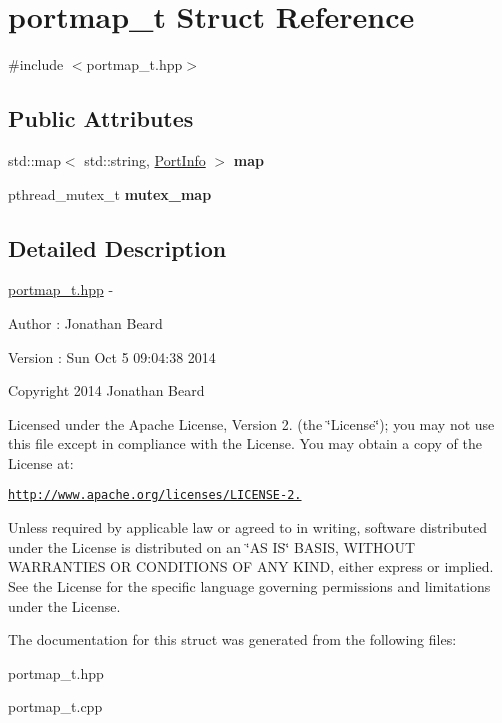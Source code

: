 \hypertarget{structportmap__t}{}\section{portmap\+\_\+t Struct Reference}
\label{structportmap__t}


{\ttfamily \#include $<$portmap\+\_\+t.\+hpp$>$}

\subsection*{Public Attributes}
\begin{DoxyCompactItemize}
\item 
\hypertarget{structportmap__t_a898d883add7b8dc54ceef7e4ef27c94f}{}std\+::map$<$ std\+::string, \hyperlink{struct_port_info}{Port\+Info} $>$ {\bfseries map}\label{structportmap__t_a898d883add7b8dc54ceef7e4ef27c94f}

\item 
\hypertarget{structportmap__t_a4feb2a226aac9cd552668a8d4c8a3a7e}{}pthread\+\_\+mutex\+\_\+t {\bfseries mutex\+\_\+map}\label{structportmap__t_a4feb2a226aac9cd552668a8d4c8a3a7e}

\end{DoxyCompactItemize}


\subsection{Detailed Description}
\hyperlink{portmap__t_8hpp_source}{portmap\+\_\+t.\+hpp} -\/ \begin{DoxyAuthor}{Author}
\+: Jonathan Beard 
\end{DoxyAuthor}
\begin{DoxyVersion}{Version}
\+: Sun Oct 5 09\+:04\+:38 2014
\end{DoxyVersion}
Copyright 2014 Jonathan Beard

Licensed under the Apache License, Version 2. (the \char`\"{}\+License\char`\"{}); you may not use this file except in compliance with the License. You may obtain a copy of the License at\+:

\href{http://www.apache.org/licenses/LICENSE-2.0}{\tt http\+://www.\+apache.\+org/licenses/\+L\+I\+C\+E\+N\+S\+E-\/2.}

Unless required by applicable law or agreed to in writing, software distributed under the License is distributed on an \char`\"{}\+A\+S I\+S\char`\"{} B\+A\+S\+I\+S, W\+I\+T\+H\+O\+U\+T W\+A\+R\+R\+A\+N\+T\+I\+E\+S O\+R C\+O\+N\+D\+I\+T\+I\+O\+N\+S O\+F A\+N\+Y K\+I\+N\+D, either express or implied. See the License for the specific language governing permissions and limitations under the License. 

The documentation for this struct was generated from the following files\+:\begin{DoxyCompactItemize}
\item 
portmap\+\_\+t.\+hpp\item 
portmap\+\_\+t.\+cpp\end{DoxyCompactItemize}
